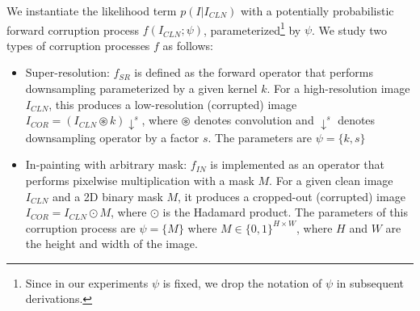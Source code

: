 \documentclass{article}
\begin{document}
We instantiate the likelihood term $p(I|I_{CLN})$ with a potentially probabilistic forward corruption process $f(I_{CLN}; \psi)$, parameterized\footnote{Since in our experiments $\psi$ is fixed, we drop the notation of $\psi$ in subsequent derivations.} by $\psi$. We study two types of corruption processes $f$ as follows:
\begin{itemize}
\item Super-resolution: $f_{SR}$ is defined as the forward operator that performs downsampling parameterized by a given kernel $k$. For a high-resolution image $I_{CLN}$, this produces a low-resolution (corrupted) image $I_{COR} = (I_{CLN} \circledast k)\downarrow^s$, where $\circledast$ denotes convolution and $\downarrow^s$ denotes downsampling operator by a factor $s$. The parameters are $\psi = \{k, s\}$
\item In-painting with arbitrary mask: $f_{IN}$ is implemented as an operator that performs pixelwise multiplication with a mask $M$. For a given clean image $I_{CLN}$ and a 2D binary mask $M$, it produces a cropped-out (corrupted) image $I_{COR} = I_{CLN} \odot M$, where $\odot$ is the Hadamard product. The parameters of this corruption process are $\psi = \{M\}$ where $M \in \{0,1\}^{H \times W}$, where $H$ and $W$ are the height and width of the image.
\end{itemize}
\end{document}
